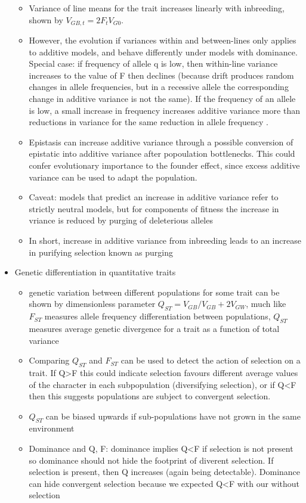 \documentclass[12pt]{amsart}
\begin{document}
\begin{itemize}
\begin{itemize}
\item Variance of line means for the trait increases linearly with inbreeding, shown by $V_{GB,t} = 2F_tV_{G0}$.
\item However, the evolution if variances within and between-lines only applies to additive models, and behave differently under models with dominance. Special case: if frequency of allele q is low, then within-line variance increases to the value of F then declines (because drift produces random changes in allele frequencies, but in a recessive allele the corresponding change in additive variance is not the same). If the frequency of an allele is low, a small increase in frequency increases additive variance more than reductions in variance for the same reduction in allele frequency . 
\item Epistasis can increase additive variance through a possible conversion of epistatic into additive variance after popoulation bottlenecks. This could confer evolutionary importance to the founder effect, since excess additive variance can be used to adapt the population. 
\item Caveat: models that predict an increase in additive variance refer to strictly neutral models, but for components of fitness the increase in vriance is reduced by purging of deleterious alleles 
\item In short, increase in additive variance from inbreeding leads to an increase in purifying selection known as purging 
\end{itemize}
\item Genetic differentiation in quantitative traits
\begin{itemize}
\item genetic variation between different populations for some trait can be shown by dimensionless parameter $Q_{ST} = V_{GB}/V_{GB}+2V_{GW}$, much like $F_{ST}$ measures allele frequency differentiation between populations, $Q_{ST}$ measures average genetic divergence for a trait as a function of total variance 
\item Comparing $Q_{ST}$ and $F_{ST}$ can be used to detect the action of selection on a trait. If Q>F this could indicate selection favours different average values of the character in each subpopulation (diversifying selection), or if Q<F then this suggests populations are subject to convergent selection. 
\item $Q_{ST}$ can be biased upwards if sub-populations have not grown in the same environment 
\item Dominance and Q, F: dominance implies Q<F if selection is not present so dominance should not hide the footprint of diverent selection. If selection is present, then Q increases (again being detectable). Dominance can hide convergent selection because we expected Q<F with our without selection

\end{itemize}
\end{itemize}
\end{document}
